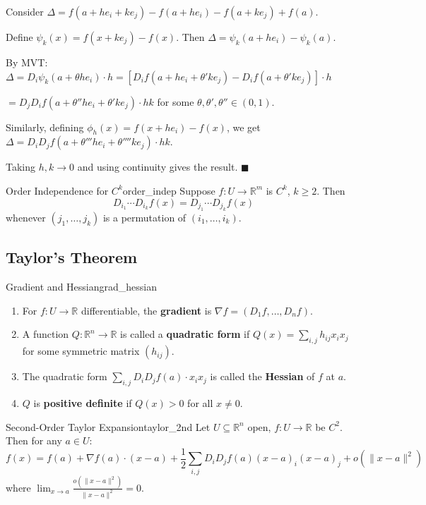 \documentclass[11pt, letterpaper, openany]{book}
\renewenvironment{proof}[1][\proofname]{%
  \tcolorbox[blanker, breakable, left=1em,
    before skip=1em, after skip=1em,
    borderline west={2pt}{0pt}{MagicTeal!50},
    colback=MagicCream,
    before upper={\textcolor{MagicTeal}{\sffamily\bfseries #1.}\space}
  ]%
}{%
  \hfill\textcolor{MagicTeal}{\ensuremath{\blacksquare}}\endtcolorbox%
}
\begin{document}
\begin{proof}[Sketch]
Consider $\Delta = f(a + he_i + ke_j) - f(a + he_i) - f(a + ke_j) + f(a)$.

Define $\psi_k(x) = f(x + ke_j) - f(x)$. Then $\Delta = \psi_k(a + he_i) - \psi_k(a)$.

By MVT: $\Delta = D_i \psi_k(a + \theta h e_i) \cdot h = [D_i f(a + he_i + \theta' k e_j) - D_i f(a + \theta' k e_j)] \cdot h$

$= D_j D_i f(a + \theta'' h e_i + \theta' k e_j) \cdot hk$ for some $\theta, \theta', \theta'' \in (0,1)$.

Similarly, defining $\phi_h(x) = f(x + he_i) - f(x)$, we get $\Delta = D_i D_j f(a + \theta''' h e_i + \theta'''' k e_j) \cdot hk$.

Taking $h, k \to 0$ and using continuity gives the result.
\end{proof}

\begin{cor}{Order Independence for $C^k$}{order_indep}
Suppose $f: U \to \mathbb{R}^m$ is $C^k$, $k \geq 2$. Then
\[D_{i_1} \cdots D_{i_k} f(x) = D_{j_1} \cdots D_{j_k} f(x)\]
whenever $(j_1, \ldots, j_k)$ is a permutation of $(i_1, \ldots, i_k)$.
\end{cor}

\subsection{Taylor's Theorem}

\begin{defn}{Gradient and Hessian}{grad_hessian}
\begin{enumerate}
    \item For $f: U \to \mathbb{R}$ differentiable, the \textbf{gradient} is $\nabla f = (D_1 f, \ldots, D_n f)$.
    \item A function $Q: \mathbb{R}^n \to \mathbb{R}$ is called a \textbf{quadratic form} if $Q(x) = \sum_{i,j} h_{ij} x_i x_j$ for some symmetric matrix $(h_{ij})$.
    \item The quadratic form $\sum_{i,j} D_i D_j f(a) \cdot x_i x_j$ is called the \textbf{Hessian} of $f$ at $a$.
    \item $Q$ is \textbf{positive definite} if $Q(x) > 0$ for all $x \neq 0$.
\end{enumerate}
\end{defn}

\begin{thm}{Second-Order Taylor Expansion}{taylor_2nd}
Let $U \subseteq \mathbb{R}^n$ open, $f: U \to \mathbb{R}$ be $C^2$. Then for any $a \in U$:
\[f(x) = f(a) + \nabla f(a) \cdot (x-a) + \frac{1}{2} \sum_{i,j} D_i D_j f(a)(x-a)_i(x-a)_j + o(\|x-a\|^2)\]
where $\lim_{x \to a} \frac{o(\|x-a\|^2)}{\|x-a\|^2} = 0$.
\end{thm}
\end{document}
